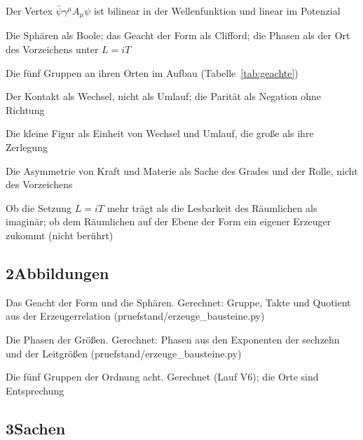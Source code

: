 \documentclass[11pt,a4paper]{article}
\begin{document}
\begin{description}[itemsep=1pt,font=\normalfont\bfseries]
\item[Befund:] Der Vertex $\bar\psi\gamma^\mu A_\mu\psi$ ist bilinear in der Wellenfunktion und linear im Potenzial
\item[These:] Die Sphären als Boole; das Geacht der Form als Clifford; die Phasen als der Ort des Vorzeichens unter $L=iT$
\item[These:] Die fünf Gruppen an ihren Orten im Aufbau (Tabelle~\ref{tab:geachte})
\item[Deutung:] Der Kontakt als Wechsel, nicht als Umlauf; die Parität als Negation ohne Richtung
\item[Deutung:] Die kleine Figur als Einheit von Wechsel und Umlauf, die große als ihre Zerlegung
\item[Deutung:] Die Asymmetrie von Kraft und Materie als Sache des Grades und der Rolle, nicht des Vorzeichens
\item[Offen:] Ob die Setzung $L=iT$ mehr trägt als die Lesbarkeit des Räumlichen als imaginär; ob dem Räumlichen auf der Ebene der Form ein eigener Erzeuger zukommt (nicht berührt)
\end{description}

\subsection*{2\quad Abbildungen}

\begin{description}[itemsep=1pt,font=\normalfont\bfseries]
\item[Abb.~\ref{fig:quotient}] Das Geacht der Form und die Sphären. Gerechnet: Gruppe, Takte und Quotient aus der Erzeugerrelation (pruefstand/erzeuge\_bausteine.py)
\item[Abb.~\ref{fig:phasen}] Die Phasen der Größen. Gerechnet: Phasen aus den Exponenten der sechzehn und der Leitgrößen (pruefstand/erzeuge\_bausteine.py)
\item[Tab.~\ref{tab:geachte}] Die fünf Gruppen der Ordnung acht. Gerechnet (Lauf V6); die Orte sind Entsprechung
\end{description}

\subsection*{3\quad Sachen}
\end{document}
